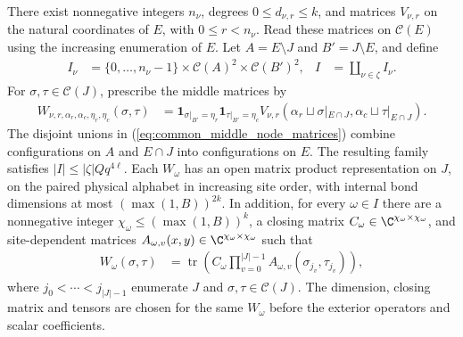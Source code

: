 \begin{lemma}
    There exist nonnegative integers $n_\nu$, degrees $0\le d_{\nu,r}\le k$, and matrices
    $V_{\nu,r}$ on the natural coordinates of $E$, with $0\le r<n_\nu$.
    Read these matrices on $\mathcal C(E)$ using the increasing enumeration
    of $E$. Let $A=E\setminus J$ and $B'=J\setminus E$, and define
    \begin{align}
        I_\nu                   & =\{0,\ldots,n_\nu-1\}\times\mathcal C(A)^2
        \times\mathcal C(B')^2, &
        I                       & =\coprod_{\nu\in\zeta} I_\nu.
        \label{eq:common_middle_node_indices}
    \end{align}
    For $\sigma,\tau\in\mathcal C(J)$, prescribe the middle matrices by
    \begin{align}
        W_{\nu,r,\alpha_r,\alpha_c,\eta_r,\eta_c}(\sigma,\tau)
         & =\mathbf1_{\sigma|_{B'}=\eta_r}\mathbf1_{\tau|_{B'}=\eta_c}
        V_{\nu,r}(\alpha_r\sqcup\sigma|_{E\cap J},
        \alpha_c\sqcup\tau|_{E\cap J}).
        \label{eq:common_middle_node_matrices}
    \end{align}
    The disjoint unions in (\ref{eq:common_middle_node_matrices}) combine
    configurations on $A$ and $E\cap J$ into configurations on $E$.
    The resulting family satisfies $|I|\le|\zeta|Qq^{4\ell}$.
    Each $W_\omega$ has an open matrix product representation on $J$, on the
    paired physical alphabet in increasing site order, with internal bond
    dimensions at most $(\max(1,B))^{2k}$.
    In addition, for every $\omega\in I$ there are a nonnegative integer
    $\chi_\omega\le(\max(1,B))^k$, a closing matrix
    $C_\omega\in\C^{\chi_\omega\times\chi_\omega}$, and site-dependent matrices
    $A_{\omega,v}(x,y)\in\C^{\chi_\omega\times\chi_\omega}$ such that
    \begin{align}
        W_\omega(\sigma,\tau)
         & =\operatorname{tr}\left(C_\omega
        \prod_{v=0}^{|J|-1}A_{\omega,v}(\sigma_{j_v},\tau_{j_v})\right),
        \label{eq:common_middle_trace_presentation}
    \end{align}
    where $j_0<\cdots<j_{|J|-1}$ enumerate $J$ and
    $\sigma,\tau\in\mathcal C(J)$.
    The dimension, closing matrix and tensors are chosen for the same
    $W_\omega$ before the exterior operators and scalar coefficients.


\end{lemma}
